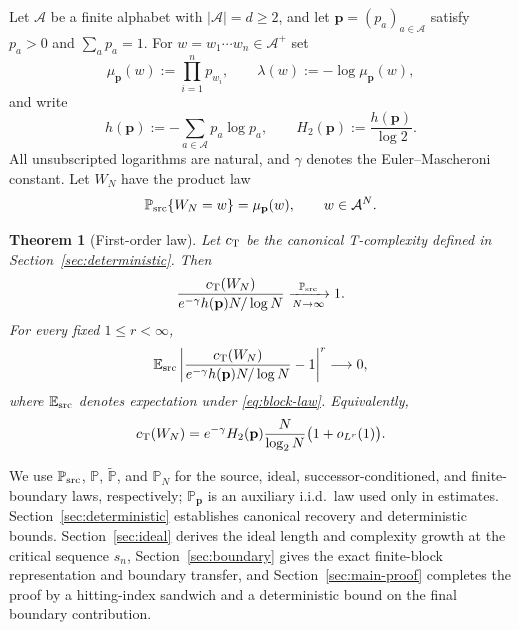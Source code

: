 \documentclass[journal]{IEEEtran}
\theoremstyle{plain}
\newtheorem{theorem}{Theorem}[section]
\theoremstyle{definition}
\theoremstyle{remark}
\newcommand{\A}{\mathcal A}
\newcommand{\Psrc}{\mathbb P_{\rm src}}
\newcommand{\Esrc}{\mathbb E_{\rm src}}
\newcommand{\Pideal}{\mathbb P}
\newcommand{\Pforb}{\widetilde{\mathbb P}}
\newcommand{\Pbound}{\mathbb P_N}
\newcommand{\Paux}{\mathbb P_{\mathbf p}}
\newcommand{\muP}{\mu_{\mathbf p}}
\newcommand{\hp}{h(\mathbf p)}
\newcommand{\cT}{c_{\rm T}}
\begin{document}
Let $\A$ be a finite alphabet with $|\A|=d\ge2$, and let $\mathbf p=(p_a)_{a\in\A}$ satisfy $p_a>0$ and $\sum_a p_a=1$.  For $w=w_1\cdots w_n\in\A^+$ set
\begin{equation}\label{eq:source-weight}
 \muP(w):=\prod_{i=1}^n p_{w_i},
 \qquad
 \lambda(w):=-\log\muP(w),
\end{equation}
and write
\begin{equation}\label{eq:entropy}
 \hp:=-\sum_{a\in\A}p_a\log p_a,
 \qquad
 H_2(\mathbf p):=\frac{\hp}{\log 2}.
\end{equation}
All unsubscripted logarithms are natural, and $\gamma$ denotes the Euler--Mascheroni constant.  Let $W_N$ have the product law
\begin{equation}\label{eq:block-law}
 \Psrc\{W_N=w\}=\muP(w),\qquad w\in\A^N.
\end{equation}

\begin{theorem}[First-order law]\label{thm:main}
Let $\cT$ be the canonical T-complexity defined in Section~\ref{sec:deterministic}.  Then
\begin{equation}\label{eq:main-prob}
 \frac{\cT(W_N)}{e^{-\gamma}\hp N/\log N}
 \xrightarrow[N\to\infty]{\Psrc}1.
\end{equation}
For every fixed $1\le r<\infty$,
\begin{equation}\label{eq:main-moments}
 \Esrc\left|
 \frac{\cT(W_N)}{e^{-\gamma}\hp N/\log N}-1
 \right|^r\longrightarrow0,
\end{equation}
where $\Esrc$ denotes expectation under \eqref{eq:block-law}.  Equivalently,
\begin{equation}\label{eq:main-bits}
 \cT(W_N)=e^{-\gamma}H_2(\mathbf p)
 \frac{N}{\log_2N}\bigl(1+o_{L^r}(1)\bigr).
\end{equation}
\end{theorem}

We use $\Psrc$, $\Pideal$, $\Pforb$, and $\Pbound$ for the source, ideal, successor-conditioned, and finite-boundary laws, respectively; $\Paux$ is an auxiliary i.i.d.\ law used only in estimates.  Section~\ref{sec:deterministic} establishes canonical recovery and deterministic bounds.  Section~\ref{sec:ideal} derives the ideal length and complexity growth at the critical sequence $s_n$, Section~\ref{sec:boundary} gives the exact finite-block representation and boundary transfer, and Section~\ref{sec:main-proof} completes the proof by a hitting-index sandwich and a deterministic bound on the final boundary contribution.
\end{document}
